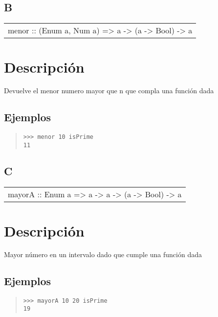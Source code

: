 \subsection{B}
\begin{haddockdesc}
\item[\begin{tabular}{@{}l}
menor :: (Enum a, Num a) => a -> (a -> Bool) -> a
\end{tabular}]
{\haddockbegindoc
\section*{Descripción}
Devuelve el menor numero mayor que n que compla una función dada\par
\subsection*{Ejemplos}
\begin{quote}
{\haddockverb\begin{verbatim}
>>> menor 10 isPrime
11

\end{verbatim}}
\end{quote}}
\end{haddockdesc}
\subsection{C}
\begin{haddockdesc}
\item[\begin{tabular}{@{}l}
mayorA :: Enum a => a -> a -> (a -> Bool) -> a
\end{tabular}]
{\haddockbegindoc
\section*{Descripción}
Mayor número en un intervalo dado que cumple una función dada\par
\subsection*{Ejemplos}
\begin{quote}
{\haddockverb\begin{verbatim}
>>> mayorA 10 20 isPrime
19

\end{verbatim}}
\end{quote}}
\end{haddockdesc}
